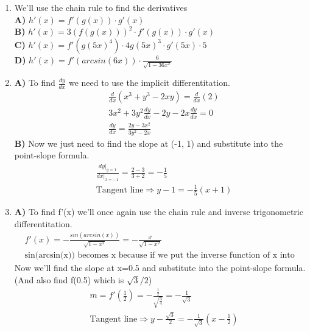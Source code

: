 \documentclass[13pt, a4paper, twoside]{article}
\begin{document}
\large \onehalfspacing
\begin{enumerate}
    \item We'll use the chain rule to find the derivatives \\ 
    \textbf{A)} $h'(x) = f'(g(x)) \cdot g'(x)$\\
    \textbf{B)} $h'(x) = 3(f(g(x)))^2 \cdot f'(g(x)) \cdot g'(x)$\\
    \textbf{C)} $h'(x)=f'(g(5x)^4) \cdot 4g(5x)^3 \cdot g'(5x) \cdot 5$\\
    \textbf{D)} $h'(x)=f'(arcsin(6x))\cdot \frac{6}{\sqrt{1-36x^2}}$

    \item \textbf{A)} To find $\frac{dy}{dx}$ we need to use the implicit
    differentitation.\\
    \begin{align*}
        &\frac{d}{dx}(x^3+y^3-2xy)= \frac{d}{dx}(2)\\
        &3x^2 + 3y^2\frac{dy}{dx} -2y - 2x\frac{dy}{dx} = 0\\
        &\frac{dy}{dx} =\frac{2y-3x^2}{3y^2-2x}
    \end{align*}
    \textbf{B)} Now we just need to find the slope at (-1, 1) and substitute
    into the point-slope formula.\\
    \begin{align*}
        &\frac{dy|_{y=1}}{dx|_{x=-1}}=\frac{2-3}{3+2} = -\frac{1}{5}\\
        &\text{Tangent line} \Rightarrow y-1 = -\frac{1}{5}(x+1)
    \end{align*}
    \item \textbf{A)} To find f'(x) we'll once again use the chain rule
    and inverse trigonometric differentitation.
    \begin{align*}
        &f'(x) = -\frac{sin(arcsin(x))}{\sqrt{1-x^2}} = -\frac{x}{\sqrt{1-x^2}}\\
        &\text{sin(arcsin(x)) becomes x because if we put the inverse function of x into the function we get x}
    \end{align*}
     Now we'll find the slope at x=0.5 and substitute into the point-slope formula.
    (And also find f(0.5) which is $\sqrt{3}/2$)
    \begin{align*}
        &m = f'(\frac{1}{2}) = -\frac{\frac{1}{2}}{\sqrt{\frac{3}{4}}} = -\frac{1}{\sqrt{3}}\\
        &\text{Tangent line} \Rightarrow y-\frac{\sqrt{3}}{2} = -\frac{1}{\sqrt{3}}(x-\frac{1}{2})
    \end{align*}

\end{enumerate}
\end{document}
